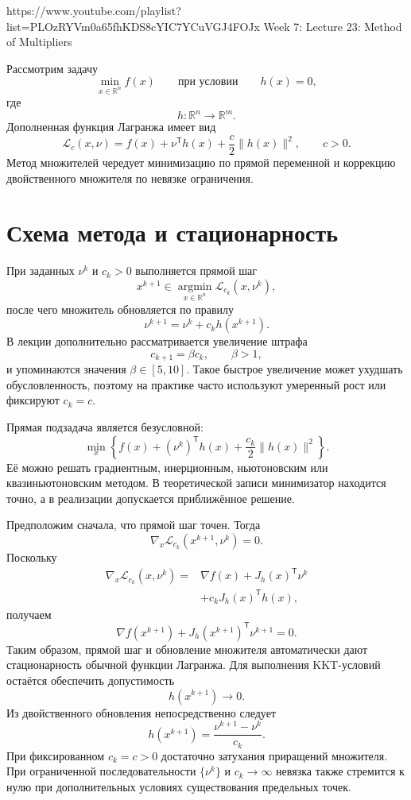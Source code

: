 
\sourcevideo
    {https://www.youtube.com/playlist?list=PLOzRYVm0a65fhKDS8cYIC7YCuVGJ4FOJx}
    {Week 7: Lecture 23: Method of Multipliers}

Рассмотрим задачу
\[
    \min_{x\in\mathbb R^n}f(x)
    \qquad
    \text{при условии}
    \qquad
    h(x)=0,
\]
где
\[
    h\colon\mathbb R^n\to\mathbb R^m.
\]
Дополненная функция Лагранжа имеет вид
\[
    \mathcal L_c(x,\nu)
    =
    f(x)
    +
    \nu^{\mathsf T}h(x)
    +
    \frac c2\lVert h(x)\rVert^2,
    \qquad
    c>0.
\]
Метод множителей чередует минимизацию по прямой переменной и
коррекцию двойственного множителя по невязке ограничения.

\section{Схема метода и стационарность}

При заданных \(\nu^k\) и \(c_k>0\) выполняется прямой шаг
\[
    x^{k+1}
    \in
    \operatorname*{argmin}_{x\in\mathbb R^n}
    \mathcal L_{c_k}(x,\nu^k),
\]
после чего множитель обновляется по правилу
\[
    \nu^{k+1}
    =
    \nu^k+c_kh(x^{k+1}).
\]
В лекции дополнительно рассматривается увеличение штрафа
\[
    c_{k+1}=\beta c_k,
    \qquad
    \beta>1,
\]
и упоминаются значения \(\beta\in[5,10]\). Такое быстрое увеличение
может ухудшать обусловленность, поэтому на практике часто используют
умеренный рост или фиксируют \(c_k=c\).

Прямая подзадача является безусловной:
\[
    \min_x
    \left\{
        f(x)
        +
        (\nu^k)^{\mathsf T}h(x)
        +
        \frac{c_k}{2}\lVert h(x)\rVert^2
    \right\}.
\]
Её можно решать градиентным, инерционным, ньютоновским или
квазиньютоновским методом. В теоретической записи минимизатор
находится точно, а в реализации допускается приближённое решение.

Предположим сначала, что прямой шаг точен. Тогда
\[
    \nabla_x\mathcal L_{c_k}(x^{k+1},\nu^k)=0.
\]
Поскольку
\[
\begin{aligned}
    \nabla_x\mathcal L_{c_k}(x,\nu^k)
    ={}&
    \nabla f(x)
    +
    J_h(x)^{\mathsf T}\nu^k
    \\
    &+
    c_kJ_h(x)^{\mathsf T}h(x),
\end{aligned}
\]
получаем
\[
    \nabla f(x^{k+1})
    +
    J_h(x^{k+1})^{\mathsf T}\nu^{k+1}
    =0.
\]
Таким образом, прямой шаг и обновление множителя автоматически дают
стационарность обычной функции Лагранжа. Для выполнения KKT-условий
остаётся обеспечить допустимость
\[
    h(x^{k+1})\to0.
\]
Из двойственного обновления непосредственно следует
\[
    h(x^{k+1})
    =
    \frac{\nu^{k+1}-\nu^k}{c_k}.
\]
При фиксированном \(c_k=c>0\) достаточно затухания приращений
множителя. При ограниченной последовательности \(\{\nu^k\}\) и
\(c_k\to\infty\) невязка также стремится к нулю при дополнительных
условиях существования предельных точек.

